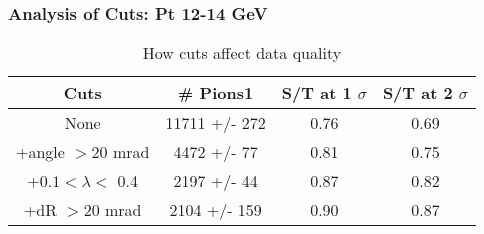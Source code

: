\frame
{
\frametitle{Analysis of Cuts: Pt 12-14 GeV}
\begin{table}
\caption{How cuts affect data quality}
\centering
\begin{tabular}{c c c c}
\hline\hline
Cuts & \# Pions1 & S/T at 1 $\sigma$ & S/T at 2 $\sigma$ \\ [0.5ex]
\hline
None & 11711 +/-  272 & 0.76 & 0.69 \\ %
+angle $> 20$ mrad & 4472 +/-   77 & 0.81 & 0.75 \\ %
+$0.1 < \lambda <$ 0.4 & 2197 +/-   44 & 0.87 & 0.82 \\ %
+dR $> 20$ mrad & 2104 +/-  159 & 0.90 & 0.87 \\ %
[1ex]
\hline
\end{tabular}
\label{table:nonlin}
\end{table}
}
